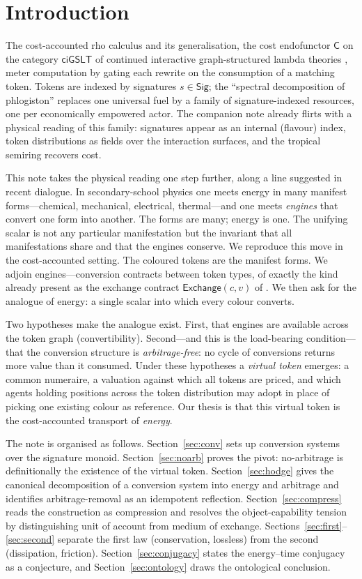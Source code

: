 \documentclass[11pt]{article}
\theoremstyle{definition}
\theoremstyle{plain}
\theoremstyle{remark}
\newcommand{\Sig}{\mathsf{Sig}}
\newcommand{\cost}{\mathsf{C}}
\newcommand{\ciGSLT}{\mathsf{ciGSLT}}
\begin{document}
\section{Introduction}

The cost-accounted rho calculus \cite{CARho} and its generalisation, the cost endofunctor $\cost$
on the category $\ciGSLT$ of continued interactive graph-structured lambda theories \cite{CE},
meter computation by gating each rewrite on the consumption of a matching token. Tokens are
indexed by signatures $s\in\Sig$; the ``spectral decomposition of phlogiston'' \cite{CARho}
replaces one universal fuel by a family of signature-indexed resources, one per economically
empowered actor. The companion note \cite{CE} already flirts with a physical reading of this
family: signatures appear as an internal (flavour) index, token distributions as fields over the
interaction surfaces, and the tropical semiring recovers cost.

This note takes the physical reading one step further, along a line suggested in recent dialogue.
In secondary-school physics one meets energy in many manifest forms---chemical, mechanical,
electrical, thermal---and one meets \emph{engines} that convert one form into another. The forms
are many; energy is one. The unifying scalar is not any particular manifestation but the invariant
that all manifestations share and that the engines conserve. We reproduce this move in the
cost-accounted setting. The coloured tokens are the manifest forms. We adjoin engines---conversion
contracts between token types, of exactly the kind already present as the exchange contract
$\mathsf{Exchange}(c,v)$ of \cite[App.~B]{CARho}. We then ask for the analogue of energy: a single
scalar into which every colour converts.

Two hypotheses make the analogue exist. First, that engines are available across the token graph
(convertibility). Second---and this is the load-bearing condition---that the conversion structure
is \emph{arbitrage-free}: no cycle of conversions returns more value than it consumed. Under these
hypotheses a \emph{virtual token} emerges: a common numeraire, a valuation against which all
tokens are priced, and which agents holding positions across the token distribution may adopt in
place of picking one existing colour as reference. Our thesis is that this virtual token is the
cost-accounted transport of \emph{energy}.

The note is organised as follows. Section~\ref{sec:conv} sets up conversion systems over the
signature monoid. Section~\ref{sec:noarb} proves the pivot: no-arbitrage is definitionally the
existence of the virtual token. Section~\ref{sec:hodge} gives the canonical decomposition of a
conversion system into energy and arbitrage and identifies arbitrage-removal as an idempotent
reflection. Section~\ref{sec:compress} reads the construction as compression and resolves the
object-capability tension by distinguishing unit of account from medium of exchange.
Sections~\ref{sec:first}--\ref{sec:second} separate the first law (conservation, lossless) from
the second (dissipation, friction). Section~\ref{sec:conjugacy} states the energy--time conjugacy
as a conjecture, and Section~\ref{sec:ontology} draws the ontological conclusion.
\end{document}
